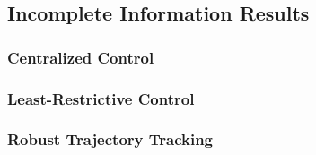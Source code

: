 \subsection{Incomplete Information Results \label{sec:basic_results}}
\subsubsection{Centralized Control}
\subsubsection{Least-Restrictive Control}
\subsubsection{Robust Trajectory Tracking}